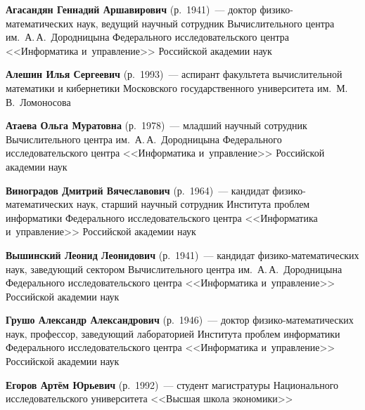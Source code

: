 \begin{multicols}{2}


\noindent
\textbf{Агасандян Геннадий Аршавирович} (р.\ 1941)~--- 
доктор фи\-зи\-ко-ма\-те\-ма\-ти\-че\-ских наук, ведущий научный сотрудник 
Вычислительного центра им.\ А.\,А.~Дородницына Федерального исследовательского центра 
<<Информатика и~управ\-ле\-ние>> Российской академии наук

\vspace*{3pt}

\noindent
\textbf{Алешин Илья Сергеевич} (р.\ 1993)~--- 
аспирант факультета вычислительной математики и кибернетики 
Московского государственного университета им.\ М.\,В.~Ломоносова

\vspace*{3pt}

\noindent
\textbf{Атаева Ольга Муратовна} (р.\ 1978)~--- 
младший научный сотрудник Вычислительного 
центра им.\ А.\,А.~Дородницына Федерального исследовательского центра 
<<Информатика и~управ\-ле\-ние>> Российской академии наук

\vspace*{3pt}

\noindent
\textbf{Виноградов Дмитрий Вячеславович} (р.\ 1964)~--- 
кандидат фи\-зи\-ко-ма\-те\-ма\-ти\-че\-ских наук, 
старший научный сотрудник Института проб\-лем информатики Федерального 
исследовательского центра <<Информатика и~управ\-ле\-ние>>
 Российской академии наук

\vspace*{3pt}

\noindent
\textbf{Вышинский Леонид Леонидович} (р.\ 1941)~--- 
кандидат фи\-зи\-ко-ма\-те\-ма\-ти\-че\-ских наук, заведующий сектором 
Вычислительного центра им.\ А.\,А.~Дородницына Федерального исследовательского 
центра <<Информатика и~управ\-ле\-ние>> Российской академии наук

\vspace*{3pt}

\noindent
\textbf{Грушо Александр Александрович} (р.\ 1946)~--- 
доктор фи\-зи\-ко-ма\-те\-ма\-ти\-че\-ских наук, профессор, заведующий лабораторией 
Института проб\-лем информатики Федерального исследовательского центра 
<<Информатика и~управ\-ле\-ние>> Российской академии наук

\vspace*{3pt}

\noindent
\textbf{Егоров Артём Юрьевич} (р.\ 1992)~---  
студент магистратуры Национального исследовательского университета 
<<Высшая школа экономики>>


\end{multicols}
